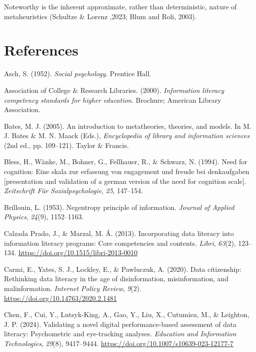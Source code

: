 \documentclass[
  12pt,
  a4paper,
  twoside]{article}
\newlength{\cslhangindent}
\newenvironment{CSLReferences}[2] %
 {\begin{list}{}{%
  \setlength{\itemindent}{0pt}
  \setlength{\leftmargin}{0pt}
  \setlength{\parsep}{0pt}
  \ifodd #1
   \setlength{\leftmargin}{\cslhangindent}
   \setlength{\itemindent}{-1\cslhangindent}
  \fi
  \setlength{\itemsep}{#2\baselineskip}}}
 {\end{list}}
\begin{document}
Noteworthy is the inherent approximate, rather than deterministic, nature of metaheuristics (Schultze \& Lorenz ,2023; Blum and Roli, 2003).

\section*{References}\label{references}

\label{refs}
\begin{CSLReferences}{1}{0}
Asch, S. (1952). \emph{Social psychology}. Prentice Hall.

Association of College \& Research Libraries. (2000). \emph{Information literacy competency standards for higher education}. Brochure; American Library Association.

Bates, M. J. (2005). An introduction to metatheories, theories, and models. In M. J. Bates \& M. N. Maack (Eds.), \emph{Encyclopedia of library and information sciences} (2nd ed., pp. 109--121). Taylor \& Francis.

Bless, H., Wänke, M., Bohner, G., Fellhauer, R., \& Schwarz, N. (1994). Need for cognition: Eine skala zur erfassung von engagement und freude bei denkaufgaben {[}presentation and validation of a german version of the need for cognition scale{]}. \emph{Zeitschrift Für Sozialpsychologie}, \emph{25}, 147--154.

Brillouin, L. (1953). Negentropy principle of information. \emph{Journal of Applied Physics}, \emph{24}(9), 1152--1163.

Calzada Prado, J., \& Marzal, M. Á. (2013). Incorporating data literacy into information literacy programs: Core competencies and contents. \emph{Libri}, \emph{63}(2), 123--134. \url{https://doi.org/10.1515/libri-2013-0010}

Carmi, E., Yates, S. J., Lockley, E., \& Pawluczuk, A. (2020). Data citizenship: Rethinking data literacy in the age of disinformation, misinformation, and malinformation. \emph{Internet Policy Review}, \emph{9}(2). \url{https://doi.org/10.14763/2020.2.1481}

Chen, F., Cui, Y., Lutsyk-King, A., Gao, Y., Liu, X., Cutumisu, M., \& Leighton, J. P. (2024). Validating a novel digital performance-based assessment of data literacy: Psychometric and eye-tracking analyses. \emph{Education and Information Technologies}, \emph{29}(8), 9417--9444. \url{https://doi.org/10.1007/s10639-023-12177-7}


\end{CSLReferences}
\end{document}
